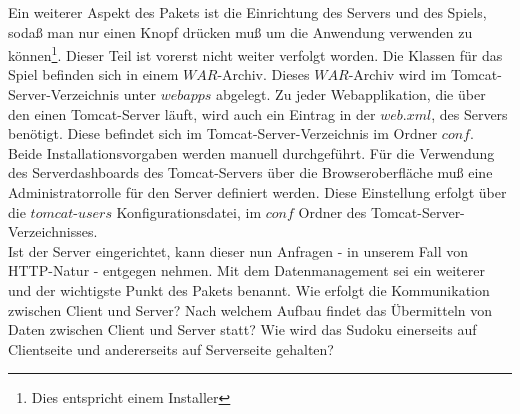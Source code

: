 \documentclass[a4paper,12pt]{scrreprt}
\begin{document}
	Ein weiterer Aspekt des Pakets ist die Einrichtung des Servers und des Spiels, soda{\ss} man nur
	einen Knopf dr\"ucken mu{\ss} um die Anwendung verwenden zu k\"onnen\footnote{Dies entspricht
	einem Installer}. Dieser Teil ist vorerst nicht weiter verfolgt worden. Die Klassen für das Spiel befinden
	sich in einem $WAR$-Archiv. Dieses $WAR$-Archiv wird im Tomcat-Server-Verzeichnis unter $webapps$
	abgelegt. Zu jeder Webapplikation, die \"uber den einen Tomcat-Server l\"auft, wird auch ein Eintrag
	in der $web.xml$, des Servers ben\"otigt. Diese befindet sich im Tomcat-Server-Verzeichnis im Ordner
	$conf$. Beide Installationsvorgaben werden manuell durchgef\"uhrt. F\"ur die Verwendung des
	Serverdashboards des Tomcat-Servers \"uber die Browseroberfl\"ache mu{\ss} eine Administratorrolle
	f\"ur den Server definiert werden. Diese Einstellung erfolgt \"uber die $tomcat$-$users$
	Konfigurationsdatei, im $conf$ Ordner des Tomcat-Server-Verzeichnisses.\medskip \\
	Ist der Server eingerichtet, kann dieser nun Anfragen - in unserem Fall von HTTP-Natur - entgegen
	nehmen. Mit dem Datenmanagement sei ein weiterer und der wichtigste Punkt des Pakets benannt.
	Wie erfolgt die Kommunikation zwischen Client und Server? Nach welchem Aufbau findet das
	\"Ubermitteln von Daten zwischen Client und Server statt? Wie wird das Sudoku einerseits auf
	Clientseite und andererseits auf Serverseite gehalten?
\end{document}
